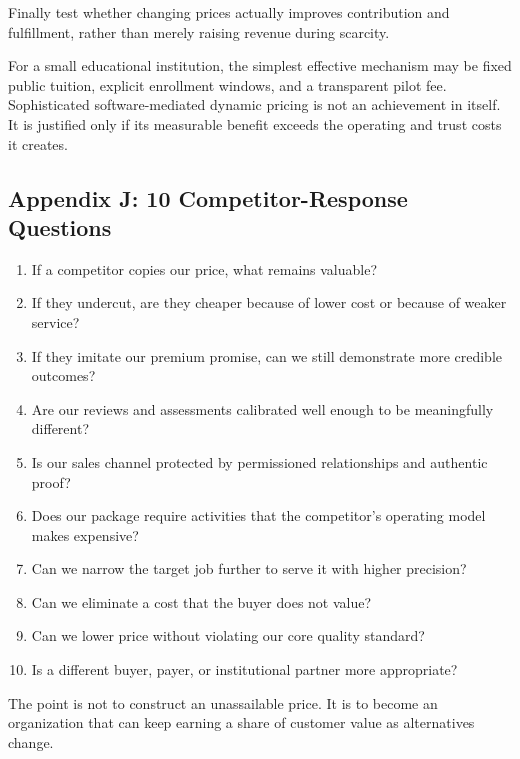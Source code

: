 Finally test whether changing prices actually improves contribution and fulfillment, rather than merely raising revenue during scarcity.

For a small educational institution, the simplest effective mechanism may be fixed public tuition, explicit enrollment windows, and a transparent pilot fee. Sophisticated software-mediated dynamic pricing is not an achievement in itself. It is justified only if its measurable benefit exceeds the operating and trust costs it creates.

\subsection*{Appendix J: 10 Competitor-Response Questions}

\begin{enumerate}
  \item If a competitor copies our price, what remains valuable?
  \item If they undercut, are they cheaper because of lower cost or because of weaker service?
  \item If they imitate our premium promise, can we still demonstrate more credible outcomes?
  \item Are our reviews and assessments calibrated well enough to be meaningfully different?
  \item Is our sales channel protected by permissioned relationships and authentic proof?
  \item Does our package require activities that the competitor's operating model makes expensive?
  \item Can we narrow the target job further to serve it with higher precision?
  \item Can we eliminate a cost that the buyer does not value?
  \item Can we lower price without violating our core quality standard?
  \item Is a different buyer, payer, or institutional partner more appropriate?
\end{enumerate}

The point is not to construct an unassailable price. It is to become an organization that can keep earning a share of customer value as alternatives change.
